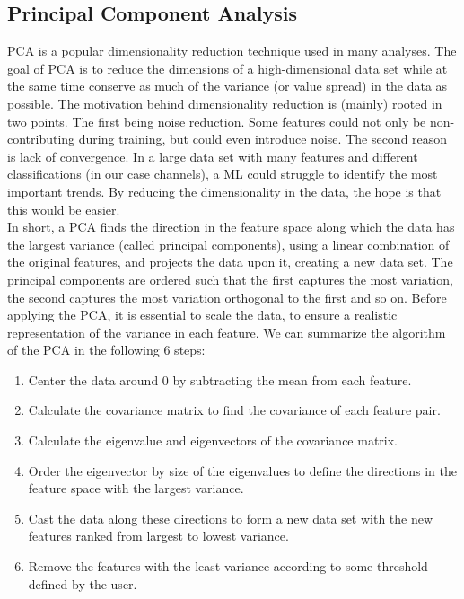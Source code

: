 \subsection{Principal Component Analysis}\label{subsec:PCA}
\acf{PCA} is a popular dimensionality reduction technique used in many analyses. The goal of
\ac{PCA} is to reduce the dimensions of a high-dimensional data set while at the same time conserve as 
much of the variance (or value spread) in the data as possible. The motivation behind dimensionality reduction 
is (mainly) rooted in two points. The first being noise reduction. Some features could not only be non-contributing 
during training, but could even introduce noise. The second reason is lack of convergence. In a large 
data set with many features and different classifications (in our case channels), a \ac{ML} could struggle
to identify the most important trends. By reducing the dimensionality in the data, the hope is that this 
would be easier. 
\\
In short, a \ac{PCA} finds the direction in the feature space along which the data has the largest 
variance (called principal components), using a linear combination of the original features, and projects the
data upon it, creating a new data set. The principal components are ordered such that the first captures the most variation,
the second captures the most variation orthogonal to the first and so on. Before applying the \ac{PCA}, it is essential to 
scale the data, to ensure a realistic representation of the variance in each feature.  We can summarize the algorithm of the 
\ac{PCA} in the following 6 steps:
\begin{enumerate}
    \item Center the data around 0 by subtracting the mean from each feature.
    \item Calculate the covariance matrix to find the covariance 
                             of each feature pair.
    \item Calculate the eigenvalue and eigenvectors of the covariance matrix.
    \item Order the eigenvector by size of the eigenvalues to define the directions 
                             in the feature space with the largest variance.
    \item Cast the data along these directions to form a new data set with 
                             the new features ranked from largest to lowest variance.
    \item Remove the features with the least variance according to some threshold
                            defined by the user.                      
\end{enumerate}
